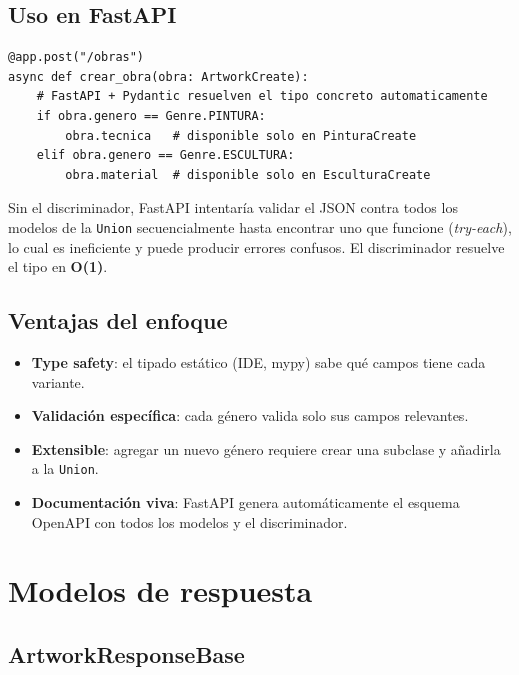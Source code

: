 \documentclass[12pt,a4paper]{article}
\begin{document}
\subsection{Uso en FastAPI}

\begin{lstlisting}
@app.post("/obras")
async def crear_obra(obra: ArtworkCreate):
    # FastAPI + Pydantic resuelven el tipo concreto automaticamente
    if obra.genero == Genre.PINTURA:
        obra.tecnica   # disponible solo en PinturaCreate
    elif obra.genero == Genre.ESCULTURA:
        obra.material  # disponible solo en EsculturaCreate
\end{lstlisting}

Sin el discriminador, FastAPI intentaría validar el JSON contra todos los
modelos de la \texttt{Union} secuencialmente hasta encontrar uno que funcione
(\emph{try-each}), lo cual es ineficiente y puede producir errores confusos.
El discriminador resuelve el tipo en \textbf{O(1)}.

\subsection{Ventajas del enfoque}

\begin{itemize}
    \item \textbf{Type safety}: el tipado estático (IDE, mypy) sabe qué campos
          tiene cada variante.
    \item \textbf{Validación específica}: cada género valida solo sus campos
          relevantes.
    \item \textbf{Extensible}: agregar un nuevo género requiere crear una
          subclase y añadirla a la \texttt{Union}.
    \item \textbf{Documentación viva}: FastAPI genera automáticamente el
          esquema OpenAPI con todos los modelos y el discriminador.
\end{itemize}

\section{Modelos de respuesta}

\subsection{ArtworkResponseBase}
\end{document}
